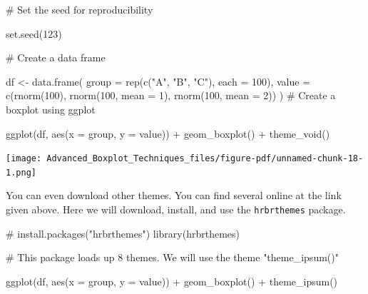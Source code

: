 \documentclass[
  letterpaper,
  DIV=11,
  numbers=noendperiod]{scrreprt}
\newenvironment{Shaded}{\begin{snugshade}}{\end{snugshade}}
\newcommand{\AttributeTok}[1]{\textcolor[rgb]{0.40,0.45,0.13}{#1}}
\newcommand{\CommentTok}[1]{\textcolor[rgb]{0.37,0.37,0.37}{#1}}
\newcommand{\DecValTok}[1]{\textcolor[rgb]{0.68,0.00,0.00}{#1}}
\newcommand{\FunctionTok}[1]{\textcolor[rgb]{0.28,0.35,0.67}{#1}}
\newcommand{\NormalTok}[1]{\textcolor[rgb]{0.00,0.23,0.31}{#1}}
\newcommand{\OtherTok}[1]{\textcolor[rgb]{0.00,0.23,0.31}{#1}}
\newcommand{\SpecialCharTok}[1]{\textcolor[rgb]{0.37,0.37,0.37}{#1}}
\newcommand{\StringTok}[1]{\textcolor[rgb]{0.13,0.47,0.30}{#1}}
\begin{document}
\begin{Shaded}
\begin{Highlighting}[]
\CommentTok{\# Set the seed for reproducibility}

\FunctionTok{set.seed}\NormalTok{(}\DecValTok{123}\NormalTok{)}

\CommentTok{\# Create a data frame}

\NormalTok{df }\OtherTok{\textless{}{-}} \FunctionTok{data.frame}\NormalTok{(}
  \AttributeTok{group =} \FunctionTok{rep}\NormalTok{(}\FunctionTok{c}\NormalTok{(}\StringTok{"A"}\NormalTok{, }\StringTok{"B"}\NormalTok{, }\StringTok{"C"}\NormalTok{), }\AttributeTok{each =} \DecValTok{100}\NormalTok{),}
  \AttributeTok{value =} \FunctionTok{c}\NormalTok{(}\FunctionTok{rnorm}\NormalTok{(}\DecValTok{100}\NormalTok{), }\FunctionTok{rnorm}\NormalTok{(}\DecValTok{100}\NormalTok{, }\AttributeTok{mean =} \DecValTok{1}\NormalTok{), }\FunctionTok{rnorm}\NormalTok{(}\DecValTok{100}\NormalTok{, }\AttributeTok{mean =} \DecValTok{2}\NormalTok{))}
\NormalTok{)}
\CommentTok{\# Create a boxplot using ggplot}

\FunctionTok{ggplot}\NormalTok{(df, }\FunctionTok{aes}\NormalTok{(}\AttributeTok{x =}\NormalTok{ group, }\AttributeTok{y =}\NormalTok{ value)) }\SpecialCharTok{+}
  \FunctionTok{geom\_boxplot}\NormalTok{() }\SpecialCharTok{+}
  \FunctionTok{theme\_void}\NormalTok{()}
\end{Highlighting}
\end{Shaded}

\begin{center}
\texttt{[image: Advanced\_Boxplot\_Techniques\_files/figure-pdf/unnamed-chunk-18-1.png]}
\end{center}

You can even download other themes. You can find several online at the
link given above. Here we will download, install, and use the
\texttt{hrbrthemes} package.

\begin{Shaded}
\begin{Highlighting}[]
\CommentTok{\# install.packages("hrbrthemes")}
\FunctionTok{library}\NormalTok{(hrbrthemes)}

\CommentTok{\# This package loads up 8 themes. We will use the theme "theme\_ipsum()"}

\FunctionTok{ggplot}\NormalTok{(df, }\FunctionTok{aes}\NormalTok{(}\AttributeTok{x =}\NormalTok{ group, }\AttributeTok{y =}\NormalTok{ value)) }\SpecialCharTok{+}
  \FunctionTok{geom\_boxplot}\NormalTok{() }\SpecialCharTok{+}
  \FunctionTok{theme\_ipsum}\NormalTok{()}
\end{Highlighting}
\end{Shaded}
\end{document}
